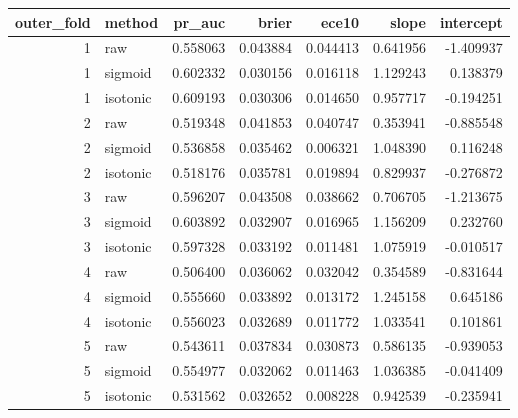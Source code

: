 \begin{tabular}{rlrrrrr}
\toprule
outer\_fold & method & pr\_auc & brier & ece10 & slope & intercept \\
\midrule
1 & raw & 0.558063 & 0.043884 & 0.044413 & 0.641956 & -1.409937 \\
1 & sigmoid & 0.602332 & 0.030156 & 0.016118 & 1.129243 & 0.138379 \\
1 & isotonic & 0.609193 & 0.030306 & 0.014650 & 0.957717 & -0.194251 \\
2 & raw & 0.519348 & 0.041853 & 0.040747 & 0.353941 & -0.885548 \\
2 & sigmoid & 0.536858 & 0.035462 & 0.006321 & 1.048390 & 0.116248 \\
2 & isotonic & 0.518176 & 0.035781 & 0.019894 & 0.829937 & -0.276872 \\
3 & raw & 0.596207 & 0.043508 & 0.038662 & 0.706705 & -1.213675 \\
3 & sigmoid & 0.603892 & 0.032907 & 0.016965 & 1.156209 & 0.232760 \\
3 & isotonic & 0.597328 & 0.033192 & 0.011481 & 1.075919 & -0.010517 \\
4 & raw & 0.506400 & 0.036062 & 0.032042 & 0.354589 & -0.831644 \\
4 & sigmoid & 0.555660 & 0.033892 & 0.013172 & 1.245158 & 0.645186 \\
4 & isotonic & 0.556023 & 0.032689 & 0.011772 & 1.033541 & 0.101861 \\
5 & raw & 0.543611 & 0.037834 & 0.030873 & 0.586135 & -0.939053 \\
5 & sigmoid & 0.554977 & 0.032062 & 0.011463 & 1.036385 & -0.041409 \\
5 & isotonic & 0.531562 & 0.032652 & 0.008228 & 0.942539 & -0.235941 \\
\bottomrule
\end{tabular}
